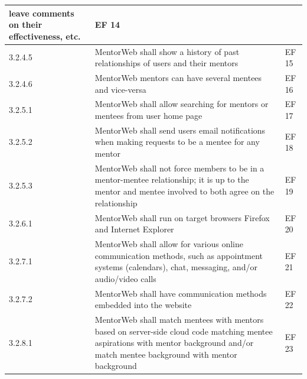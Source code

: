 \documentclass[11pt]{article}
\begin{document}
\begin{center}
\begin{longtable}{|l|p{8 cm}|l|}
                  leave comments\index{Comments} on
                  their effectiveness, etc.             & EF 14 \\ \hline
        3.2.4.5 & MentorWeb\index{MentorWeb} shall show
                  a history of past relationships of
                  users and their mentors\index{Mentor} & EF 15 \\ \hline
        3.2.4.6 & MentorWeb\index{MentorWeb}
                  mentors\index{Mentor} can have several
                  mentees\index{Mentee} and vice-versa  & EF 16 \\ \hline
        3.2.5.1 & MentorWeb\index{MentorWeb} shall
                  allow searching for
                  mentors\index{Mentors} or
                  mentees\index{Mentees} from user home
                  page                                  & EF 17 \\ \hline
        3.2.5.2 & MentorWeb\index{MentorWeb} shall send
                  users email notifications when making
                  requests to be a mentee\index{Mentee}
                  for any mentor\index{Mentor}          & EF 18 \\ \hline
        3.2.5.3 & MentorWeb\index{MentorWeb} shall not
                  force members to be in a
                  mentor\index{Mentor}-mentee\index{Mentee}
                  relationship; it is up to the
                  mentor\index{Mentor} and
                  mentee\index{Mentee} involved to both
                  agree on the relationship             & EF 19 \\ \hline
        3.2.6.1 & MentorWeb\index{MentorWeb} shall run
                  on target browsers Firefox and
                  Internet Explorer                     & EF 20 \\ \hline
        3.2.7.1 & MentorWeb\index{MentorWeb} shall allow
                  for various online
                  communication\index{Conversation}
                  methods, such as appointment systems
                  (calendars), chat, messaging, and/or
                  audio/video calls                     & EF 21 \\ \hline
        3.2.7.2 & MentorWeb\index{MentorWeb} shall have
                  communication methods embedded into
                  the website                           & EF 22 \\ \hline
        3.2.8.1 & MentorWeb\index{MentorWeb} shall match
                  mentees\index{Mentee} with
                  mentors\index{Mentor} based on
                  server-side cloud code matching mentee
                  \index{Mentee} aspirations with mentor
                  \index{Mentor} background and/or match
                  mentee\index{Mentee} background with
                  mentor\index{Mentor} background       & EF 23 \\ \hline
    \end{longtable}
    \end{center}
\end{document}

